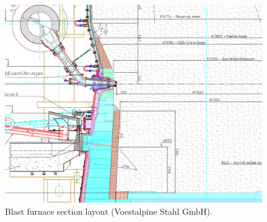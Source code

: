 \begin{figure}[!htb]
\centering
\includegraphics[width=.80\columnwidth]{images/068racewaylayout}
\caption[Blast furnace section layout]{Blast furnace section layout (Voestalpine Stahl GmbH).}
\label{fig:068racewaylayout}
\end{figure}